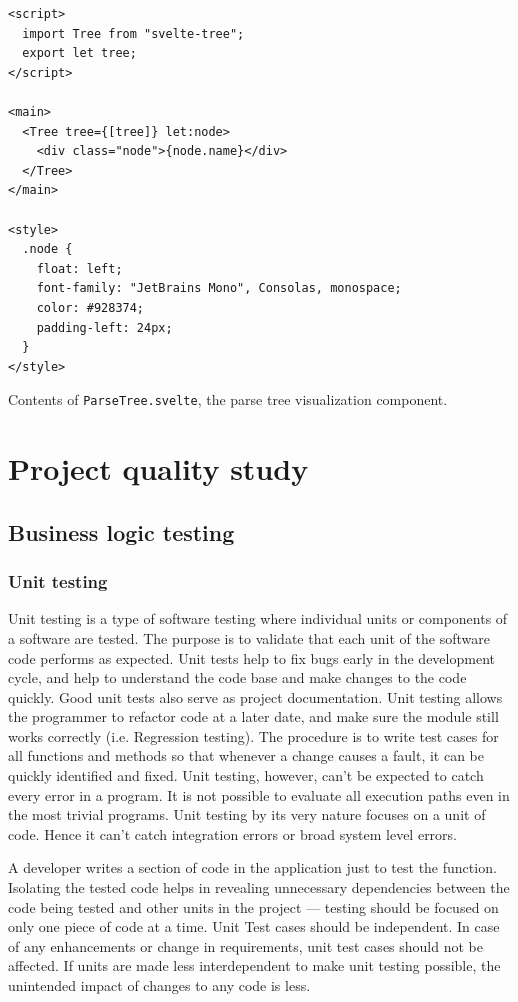 \documentclass[english,bachelors,forcepolishlogotype]{wizthesis}
\newcommand{\paraphrase}[1]{#1}
\begin{document}
\begin{listing}[H]
  \begin{verbatim}
<script>
  import Tree from "svelte-tree";
  export let tree;
</script>

<main>
  <Tree tree={[tree]} let:node>
    <div class="node">{node.name}</div>
  </Tree>
</main>

<style>
  .node {
    float: left;
    font-family: "JetBrains Mono", Consolas, monospace;
    color: #928374;
    padding-left: 24px;
  }
</style>
  \end{verbatim}
  \caption{Contents of \texttt{ParseTree.svelte}, the parse tree visualization
  component.}
  \label{lst:svelte-parse-tree}
\end{listing}

\chapter{Project quality study} \label{ch:project-quality-study}

\section{Business logic testing} \label{sec:testing}

\subsection{Unit testing}

\paraphrase{Unit testing is a type of software testing where individual units or
components of a software are tested. The purpose is to validate that each unit
of the software code performs as expected. Unit tests help to fix bugs early in
the development cycle, and help to understand the code base and make changes to
the code quickly. Good unit tests also serve as project documentation. Unit
testing allows the programmer to refactor code at a later date, and make sure
the module still works correctly (i.e. Regression testing). The procedure is to
write test cases for all functions and methods so that whenever a change causes
a fault, it can be quickly identified and fixed. Unit testing, however, can't be
expected to catch every error in a program. It is not possible to evaluate all
execution paths even in the most trivial programs. Unit testing by its very
nature focuses on a unit of code. Hence it can't catch integration errors or
broad system level errors.

A developer writes a section of code in the application just to test the
function. Isolating the tested code helps in revealing unnecessary dependencies
between the code being tested and other units in the project --- testing should
be focused on only one piece of code at a time. Unit Test cases should be
independent. In case of any enhancements or change in requirements, unit test
cases should not be affected. If units are made less interdependent to make unit
testing possible, the unintended impact of changes to any code is less.}
\end{document}
